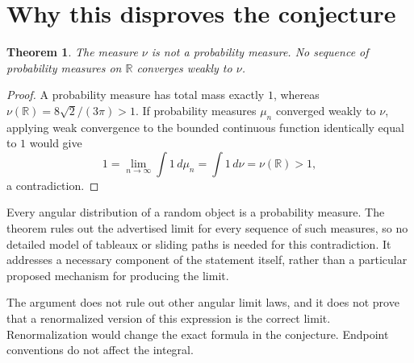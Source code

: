 \documentclass[11pt]{article}
\newtheorem{theorem}{Theorem}
\newcommand{\R}{\mathbb R}
\begin{document}
\section{Why this disproves the conjecture}
\begin{theorem}
The measure $\nu$ is not a probability measure. No sequence of probability measures on $\R$ converges weakly to $\nu$.
\end{theorem}
\begin{proof}
A probability measure has total mass exactly $1$, whereas $\nu(\R)=8\sqrt2/(3\pi)>1$. If probability measures $\mu_n$ converged weakly to $\nu$, applying weak convergence to the bounded continuous function identically equal to $1$ would give
\[
 1=\lim_{n\to\infty}\int 1\,d\mu_n=\int 1\,d\nu=\nu(\R)>1,
\]
a contradiction.
\end{proof}
Every angular distribution of a random object is a probability measure. The theorem rules out the advertised limit for every sequence of such measures, so no detailed model of tableaux or sliding paths is needed for this contradiction. It addresses a necessary component of the statement itself, rather than a particular proposed mechanism for producing the limit.

The argument does not rule out other angular limit laws, and it does not prove that a renormalized version of this expression is the correct limit. Renormalization would change the exact formula in the conjecture. Endpoint conventions do not affect the integral.
\end{document}

